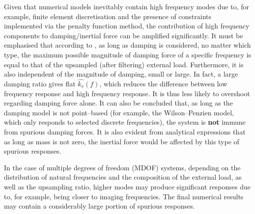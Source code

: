 Given that numerical models inevitably contain high frequency modes due to, for example, finite element discretisation and the presence of constraints implemented via the penalty function method, the contribution of high frequency components to damping/inertial force can be amplified significantly. It must be emphasised that according to , as long as damping is considered, no matter which type, the maximum possible magnitude of damping force of a specific frequency is equal to that of the upsampled (after filtering) external load. Furthermore, it is also independent of the magnitude of damping, small or large. In fact, a large damping ratio gives flat $\hat{k_v}\left(f\right)$, which reduces the difference between low frequency response and high frequency response. It is thus less likely to overshoot regarding damping force alone. It can also be concluded that, as long as the damping model is not point--based (for example, the Wilson--Penzien model, which only responds to selected discrete frequencies), the system is \textbf{not} immune from spurious damping forces. It is also evident from analytical expressions that as long as mass is not zero, the inertial force would be affected by this type of spurious responses.

In the case of multiple degrees of freedom (MDOF) systems, depending on the distribution of natural frequencies and the composition of the external load, as well as the upsampling ratio, higher modes may produce significant responses due to, for example, being closer to imaging frequencies. The final numerical results may contain a considerably large portion of spurious responses.
